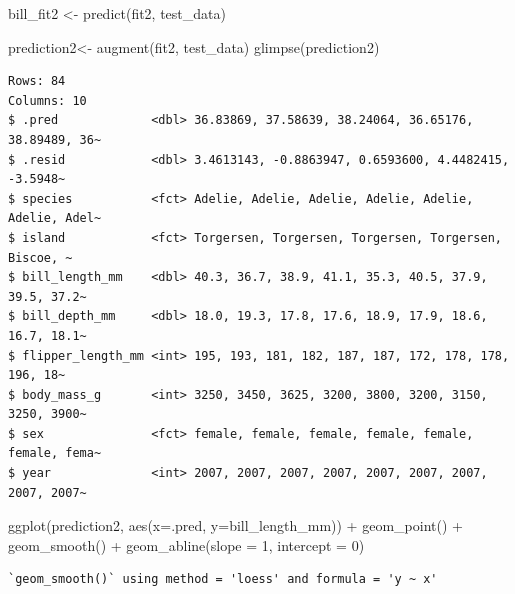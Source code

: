 \documentclass[
  letterpaper,
  DIV=11,
  numbers=noendperiod]{scrreprt}
\newenvironment{Shaded}{\begin{snugshade}}{\end{snugshade}}
\newcommand{\AttributeTok}[1]{\textcolor[rgb]{0.40,0.45,0.13}{#1}}
\newcommand{\DecValTok}[1]{\textcolor[rgb]{0.68,0.00,0.00}{#1}}
\newcommand{\FunctionTok}[1]{\textcolor[rgb]{0.28,0.35,0.67}{#1}}
\newcommand{\NormalTok}[1]{\textcolor[rgb]{0.00,0.23,0.31}{#1}}
\newcommand{\OtherTok}[1]{\textcolor[rgb]{0.00,0.23,0.31}{#1}}
\newcommand{\SpecialCharTok}[1]{\textcolor[rgb]{0.37,0.37,0.37}{#1}}
\begin{document}
\begin{Shaded}
\begin{Highlighting}[]
\NormalTok{bill\_fit2 }\OtherTok{\textless{}{-}} \FunctionTok{predict}\NormalTok{(fit2, test\_data)}

\NormalTok{prediction2}\OtherTok{\textless{}{-}} \FunctionTok{augment}\NormalTok{(fit2, test\_data)}
\FunctionTok{glimpse}\NormalTok{(prediction2)}
\end{Highlighting}
\end{Shaded}

\begin{verbatim}
Rows: 84
Columns: 10
$ .pred             <dbl> 36.83869, 37.58639, 38.24064, 36.65176, 38.89489, 36~
$ .resid            <dbl> 3.4613143, -0.8863947, 0.6593600, 4.4482415, -3.5948~
$ species           <fct> Adelie, Adelie, Adelie, Adelie, Adelie, Adelie, Adel~
$ island            <fct> Torgersen, Torgersen, Torgersen, Torgersen, Biscoe, ~
$ bill_length_mm    <dbl> 40.3, 36.7, 38.9, 41.1, 35.3, 40.5, 37.9, 39.5, 37.2~
$ bill_depth_mm     <dbl> 18.0, 19.3, 17.8, 17.6, 18.9, 17.9, 18.6, 16.7, 18.1~
$ flipper_length_mm <int> 195, 193, 181, 182, 187, 187, 172, 178, 178, 196, 18~
$ body_mass_g       <int> 3250, 3450, 3625, 3200, 3800, 3200, 3150, 3250, 3900~
$ sex               <fct> female, female, female, female, female, female, fema~
$ year              <int> 2007, 2007, 2007, 2007, 2007, 2007, 2007, 2007, 2007~
\end{verbatim}

\begin{Shaded}
\begin{Highlighting}[]
\FunctionTok{ggplot}\NormalTok{(prediction2, }\FunctionTok{aes}\NormalTok{(}\AttributeTok{x=}\NormalTok{.pred, }\AttributeTok{y=}\NormalTok{bill\_length\_mm)) }\SpecialCharTok{+} \FunctionTok{geom\_point}\NormalTok{() }\SpecialCharTok{+} \FunctionTok{geom\_smooth}\NormalTok{() }\SpecialCharTok{+} \FunctionTok{geom\_abline}\NormalTok{(}\AttributeTok{slope =} \DecValTok{1}\NormalTok{, }\AttributeTok{intercept =} \DecValTok{0}\NormalTok{)}
\end{Highlighting}
\end{Shaded}

\begin{verbatim}
`geom_smooth()` using method = 'loess' and formula = 'y ~ x'
\end{verbatim}
\end{document}
